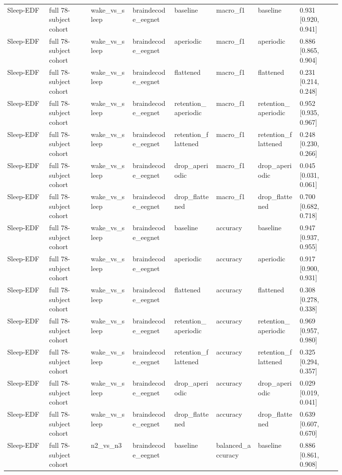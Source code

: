 \begin{longtable}{p{0.10\linewidth}p{0.10\linewidth}p{0.10\linewidth}p{0.10\linewidth}p{0.10\linewidth}p{0.10\linewidth}p{0.10\linewidth}p{0.10\linewidth}}
Sleep-EDF & full 78-subject cohort & wake\_vs\_sleep & braindecode\_eegnet & baseline & macro\_f1 & baseline & 0.931 [0.920, 0.941]\\
Sleep-EDF & full 78-subject cohort & wake\_vs\_sleep & braindecode\_eegnet & aperiodic & macro\_f1 & aperiodic & 0.886 [0.865, 0.904]\\
Sleep-EDF & full 78-subject cohort & wake\_vs\_sleep & braindecode\_eegnet & flattened & macro\_f1 & flattened & 0.231 [0.214, 0.248]\\
Sleep-EDF & full 78-subject cohort & wake\_vs\_sleep & braindecode\_eegnet & retention\_aperiodic & macro\_f1 & retention\_aperiodic & 0.952 [0.935, 0.967]\\
Sleep-EDF & full 78-subject cohort & wake\_vs\_sleep & braindecode\_eegnet & retention\_flattened & macro\_f1 & retention\_flattened & 0.248 [0.230, 0.266]\\
Sleep-EDF & full 78-subject cohort & wake\_vs\_sleep & braindecode\_eegnet & drop\_aperiodic & macro\_f1 & drop\_aperiodic & 0.045 [0.031, 0.061]\\
Sleep-EDF & full 78-subject cohort & wake\_vs\_sleep & braindecode\_eegnet & drop\_flattened & macro\_f1 & drop\_flattened & 0.700 [0.682, 0.718]\\
Sleep-EDF & full 78-subject cohort & wake\_vs\_sleep & braindecode\_eegnet & baseline & accuracy & baseline & 0.947 [0.937, 0.955]\\
Sleep-EDF & full 78-subject cohort & wake\_vs\_sleep & braindecode\_eegnet & aperiodic & accuracy & aperiodic & 0.917 [0.900, 0.931]\\
Sleep-EDF & full 78-subject cohort & wake\_vs\_sleep & braindecode\_eegnet & flattened & accuracy & flattened & 0.308 [0.278, 0.338]\\
Sleep-EDF & full 78-subject cohort & wake\_vs\_sleep & braindecode\_eegnet & retention\_aperiodic & accuracy & retention\_aperiodic & 0.969 [0.957, 0.980]\\
Sleep-EDF & full 78-subject cohort & wake\_vs\_sleep & braindecode\_eegnet & retention\_flattened & accuracy & retention\_flattened & 0.325 [0.294, 0.357]\\
Sleep-EDF & full 78-subject cohort & wake\_vs\_sleep & braindecode\_eegnet & drop\_aperiodic & accuracy & drop\_aperiodic & 0.029 [0.019, 0.041]\\
Sleep-EDF & full 78-subject cohort & wake\_vs\_sleep & braindecode\_eegnet & drop\_flattened & accuracy & drop\_flattened & 0.639 [0.607, 0.670]\\
Sleep-EDF & full 78-subject cohort & n2\_vs\_n3 & braindecode\_eegnet & baseline & balanced\_accuracy & baseline & 0.886 [0.861, 0.908]\\

\end{longtable}
